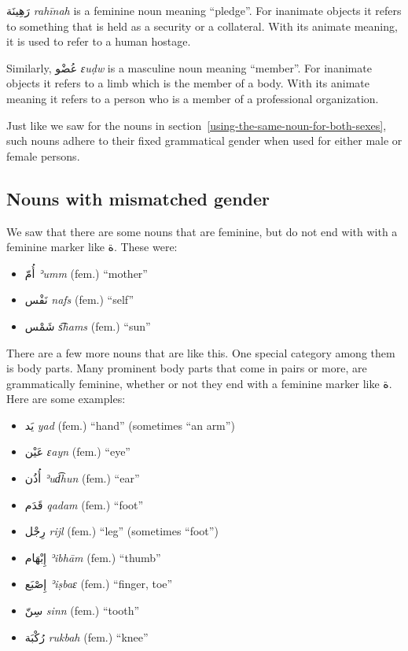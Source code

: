 \documentclass[
  10pt,
]{book}
\providecommand{\tightlist}{%
  \setlength{\itemsep}{0pt}\setlength{\parskip}{0pt}}
\begin{document}
\foreignlanguage{arabic}{رَهِينَة} \emph{rahīnah} is a feminine noun meaning \enquote{pledge}. For inanimate objects it refers to something that is held as a security or a collateral. With its animate meaning, it is used to refer to a human hostage.

Similarly,
\foreignlanguage{arabic}{عُضْو} \emph{ɛuḍw} is a masculine noun meaning \enquote{member}. For inanimate objects it refers to a limb which is the member of a body. With its animate meaning it refers to a person who is a member of a professional organization.

Just like we saw for the nouns in section~\ref{using-the-same-noun-for-both-sexes},
such nouns adhere to their fixed grammatical gender when used for either male or female persons.

\subsection{Nouns with mismatched gender}\label{nouns-with-mismatched-gender}

We saw that there are some nouns that are feminine, but do not end with with a feminine marker like \foreignlanguage{arabic}{ة}. These were:

\begin{itemize}
\tightlist
\item
  \foreignlanguage{arabic}{أُمّ} \emph{ʾumm} (fem.) \enquote{mother}
\item
  \foreignlanguage{arabic}{نَفْس} \emph{nafs} (fem.) \enquote{self}
\item
  \foreignlanguage{arabic}{شَمْس} \emph{s͡hams} (fem.) \enquote{sun}
\end{itemize}

There are a few more nouns that are like this. One special category among them is body parts. Many prominent body parts that come in pairs or more, are grammatically feminine, whether or not they end with a feminine marker like \foreignlanguage{arabic}{ة}. Here are some examples:

\begin{itemize}
\tightlist
\item
  \foreignlanguage{arabic}{يَد} \emph{yad} (fem.) \enquote{hand} (sometimes \enquote{an arm})
\item
  \foreignlanguage{arabic}{عَيْن} \emph{ɛayn} (fem.) \enquote{eye}
\item
  \foreignlanguage{arabic}{أُذُن} \emph{ʾud͡hun} (fem.) \enquote{ear}
\item
  \foreignlanguage{arabic}{قَدَم} \emph{qadam} (fem.) \enquote{foot}
\item
  \foreignlanguage{arabic}{رِجْل} \emph{rijl} (fem.) \enquote{leg} (sometimes \enquote{foot})
\item
  \foreignlanguage{arabic}{إِبْهَام} \emph{ʾibhām} (fem.) \enquote{thumb}
\item
  \foreignlanguage{arabic}{إِصْبَع} \emph{ʾiṣbaɛ} (fem.) \enquote{finger, toe}
\item
  \foreignlanguage{arabic}{سِنّ} \emph{sinn} (fem.) \enquote{tooth}
\item
  \foreignlanguage{arabic}{رُکْبَة} \emph{rukbah} (fem.) \enquote{knee}
\end{itemize}
\end{document}
